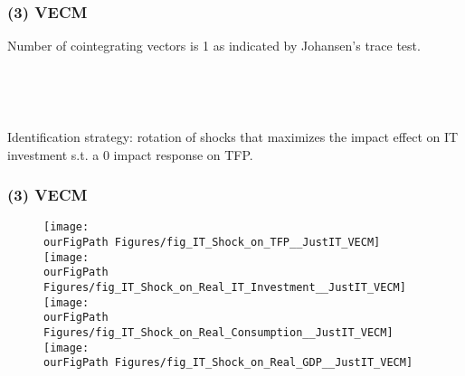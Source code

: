 \documentclass{beamer}
\def \ourFigPath {../../}
\begin{document}
\begin{frame}
	\frametitle{(3) VECM}

Number of cointegrating vectors is 1 as indicated by Johansen's trace test.

\

\


Identification strategy: rotation of shocks that maximizes the impact effect on IT investment s.t. a 0 impact response on TFP.	


\end{frame}

\begin{frame}
\frametitle{(3) VECM}

\vspace{-0.2cm}
\begin{figure}
	\begin{multicols}{2}
		\centering 
		\texttt{[image: \\ourFigPath Figures/fig\_IT\_Shock\_on\_TFP\_\_JustIT\_VECM]}\\
		\vspace{0.3cm}
		\texttt{[image: \\ourFigPath Figures/fig\_IT\_Shock\_on\_Real\_IT\_Investment\_\_JustIT\_VECM]}\\ 
		\vspace{0.3cm}
		\texttt{[image: \\ourFigPath Figures/fig\_IT\_Shock\_on\_Real\_Consumption\_\_JustIT\_VECM]}\\ 
		\vspace{0.3cm}
		\texttt{[image: \\ourFigPath Figures/fig\_IT\_Shock\_on\_Real\_GDP\_\_JustIT\_VECM]}\\ 
		
	\end{multicols}
\end{figure}


\end{frame}
\end{document}

